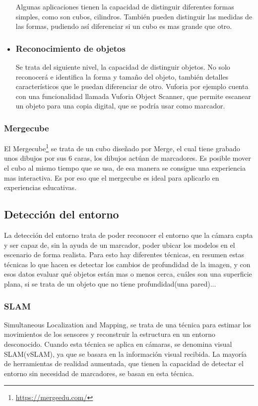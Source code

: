 \begin{itemize}
		Algunas aplicaciones tienen la capacidad de distinguir diferentes formas simples, como son cubos, cilindros. También pueden distinguir las medidas de las formas, pudiendo así diferenciar si un cubo es mas grande que otro.
		\item \subsubsection{Reconocimiento de objetos}
		Se trata del siguiente nivel, la capacidad de distinguir objetos. No solo reconocerá e identifica la forma y tamaño del objeto, también detalles característicos que le puedan diferenciar de otro. Vuforia por ejemplo cuenta con una funcionalidad llamada Vuforia Object Scanner, que permite escanear un objeto para una copia digital, que se podría usar como marcador.
	\end{itemize}
	\subsubsection{Mergecube}
	El Mergecube\footnote{\url{https://mergeedu.com/}} se trata de un cubo diseñado por Merge, el cual tiene grabado unos dibujos por sus 6 caras, los dibujos actúan de marcadores. Es posible mover el cubo al mismo tiempo que se usa, de esa manera se consigue una experiencia mas interactiva. Es por eso que el mergecube es ideal para aplicarlo en experiencias educativas.
	\subsection{Detección del entorno}
	La detección del entorno trata de poder reconocer el entorno que la cámara capta y ser capaz de, sin la ayuda de un marcador, poder ubicar los modelos en el escenario de forma realista.
	Para esto hay diferentes técnicas, en resumen estas técnicas lo que hacen es detectar los cambios de profundidad de la imagen, y con esos datos evaluar qué objetos están mas o menos cerca, cuáles son una superficie plana, si se trata de un objeto que no tiene profundidad(una pared)...
	\subsubsection{SLAM}
	Simultaneous Localization and Mapping, se trata de una técnica para estimar los movimientos de los sensores y reconstruir la estructura en un entorno desconocido. Cuando esta técnica se aplica en cámaras, se denomina visual SLAM(vSLAM), ya que se basara en la información visual recibida.
	La mayoría de herramientas de realidad aumentada, que tienen la capacidad de detectar el entorno sin necesidad de marcadores, se basan en esta técnica.
	
